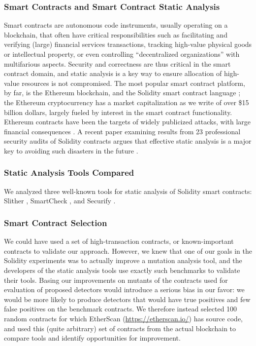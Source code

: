\subsubsection{Smart Contracts and Smart Contract Static Analysis}

Smart contracts are autonomous code instruments, usually operating on a blockchain, that often have critical responsibilities such as facilitating and verifying (large) financial services transactions, tracking high-value physical goods or intellectual property, or even controlling ``decentralized organizations'' with multifarious aspects.  Security and correctness are thus critical in the smart contract domain, and static analysis is a key way to ensure allocation of high-value resources is not compromised.  The most popular smart contract platform, by far, is the Ethereum blockchain, and the Solidity smart contract language \cite{buterin2013whitepaper,wood2014yellow}; the Ethereum cryptocurrency has a market capitalization as we write of over \$15 billion dollars, largely fueled by interest in the smart contract functionality.  Ethereum contracts have been the targets of widely publicized attacks, with large financial consequences  \cite{spank,DAO}.   A recent paper examining results from 23 professional security audits of Solidity contracts argues that effective static analysis is a major key to avoiding such disasters in the future \cite{FC20}.

\subsubsection{Static Analysis Tools Compared}

We analyzed three well-known tools for static analysis of Solidity smart contracts: Slither \cite{slither}, SmartCheck \cite{smartcheck}, and Securify \cite{Securify}. 

\subsubsection{Smart Contract Selection}

We could have used a set of high-transaction contracts, or known-important contracts to validate our approach.  However, we knew that one of our goals in the Solidity experiments was to actually improve a mutation analysis tool, and the developers of the static analysis tools use exactly such benchmarks to validate their tools.  Basing our improvements on mutants of the contracts used for evaluation of proposed detectors would introduce a serious bias in our favor: we would be more likely to produce detectors that would have true positives and few false positives on the benchmark contracts.  We therefore instead selected 100 random contracts for which EtherScan (\url{https://etherscan.io/}) has source code, and used this (quite arbitrary) set of contracts from the actual blockchain to compare tools and identify opportunities for improvement.


